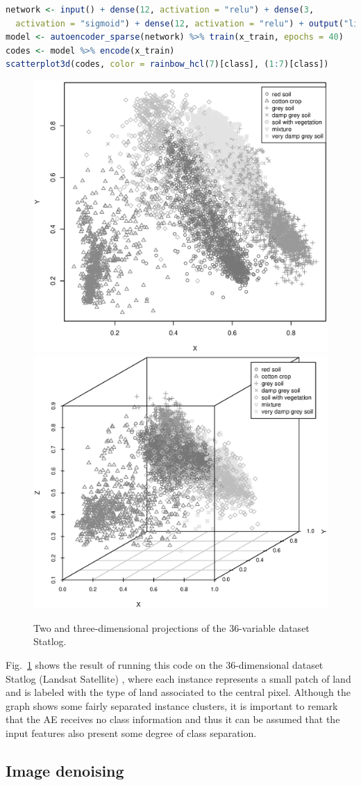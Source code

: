 \documentclass[
	fontsize=11pt, %
	twoside=false, %
	open=any, %
	secnumdepth=1, %
]{kaobook}
\begin{document}
\begin{lstlisting}[language=R]
network <- input() + dense(12, activation = "relu") + dense(3, 
  activation = "sigmoid") + dense(12, activation = "relu") + output("linear")
model <- autoencoder_sparse(network) %>% train(x_train, epochs = 40)
codes <- model %>% encode(x_train)
scatterplot3d(codes, color = rainbow_hcl(7)[class], (1:7)[class])
\end{lstlisting}

\begin{figure}[ht]
    \centering
    \includegraphics[width=.49\textwidth]{visualization_sat2.eps}
    \includegraphics[width=.49\textwidth]{visualization_sat3.eps}
    \caption{Two and three-dimensional projections of the 36-variable dataset Statlog.}
    \label{fig:visualization}
\end{figure}

Fig.~\ref{fig:visualization} shows the result of running this code on the 36-dimensional dataset Statlog (Landsat Satellite) \cite{ucirepo}, 
where each instance represents a small patch of land and is labeled with the type of land associated to the central pixel. Although the graph shows some fairly separated instance clusters, it is important to remark that the AE receives no class information and thus it can be assumed that the input features also present some degree of class separation.


\subsection{Image denoising}
\label{sec.denoising}
\end{document}
